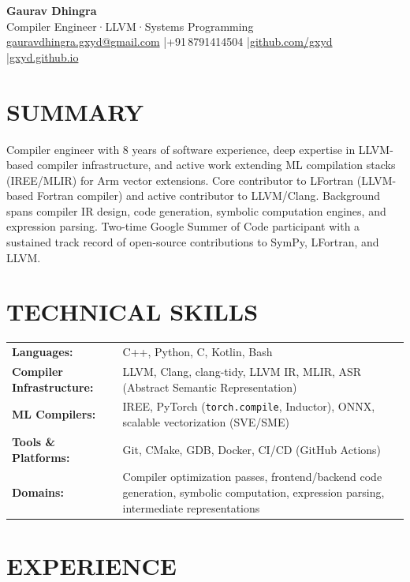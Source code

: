 \documentclass[11pt, a4paper]{article}
\newcommand{\skillrow}[2]{%
    \textbf{#1:} & #2 \\[2pt]
}
\begin{document}
\begin{center}
    {\LARGE\bfseries Gaurav Dhingra}\\[0.2em]
    {\color{muted} Compiler Engineer\enspace·\enspace LLVM\enspace·\enspace Systems Programming}\\[0.4em]
    {\small
        \href{mailto:gauravdhingra.gxyd@gmail.com}{gauravdhingra.gxyd@gmail.com}
        \enspace|\enspace +91\,8791414504
        \enspace|\enspace \href{https://github.com/gxyd}{github.com/gxyd}
        \enspace|\enspace \href{https://gxyd.github.io}{gxyd.github.io}
    }
\end{center}

\section{SUMMARY}

Compiler engineer with 8 years of software experience, deep expertise in
LLVM-based compiler infrastructure, and active work extending ML compilation
stacks (IREE/MLIR) for Arm vector extensions. Core contributor to LFortran
(LLVM-based Fortran compiler) and active contributor to LLVM/Clang. Background
spans compiler IR design, code generation, symbolic computation engines, and
expression parsing. Two-time Google Summer of Code participant with a sustained
track record of open-source contributions to SymPy, LFortran, and LLVM.

\section{TECHNICAL SKILLS}

\begin{tabularx}{\textwidth}{@{} l X @{}}
    \skillrow{Languages}{C++, Python, C, Kotlin, Bash}
    \skillrow{Compiler Infrastructure}{LLVM, Clang, clang-tidy, LLVM IR, MLIR, ASR (Abstract Semantic Representation)}
    \skillrow{ML Compilers}{IREE, PyTorch (\texttt{torch.compile}, Inductor), ONNX, scalable vectorization (SVE/SME)}
    \skillrow{Tools \& Platforms}{Git, CMake, GDB, Docker, CI/CD (GitHub Actions)}
    \skillrow{Domains}{Compiler optimization passes, frontend/backend code generation, symbolic computation, expression parsing, intermediate representations}
\end{tabularx}

\section{EXPERIENCE}
\end{document}
